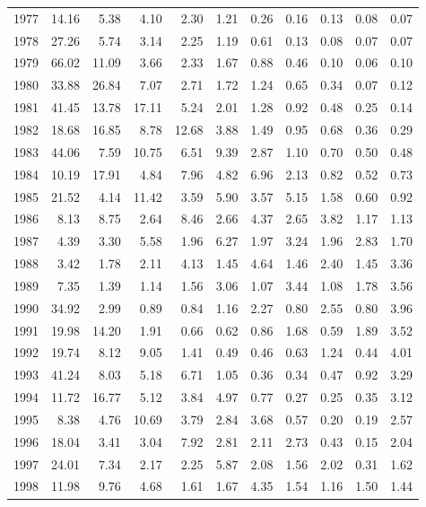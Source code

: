 \documentclass[]{article}
\begin{document}
\begin{table}[ht]
\begin{tabular}{rrrrrrrrrrr}
  1977 & 14.16 & 5.38 & 4.10 & 2.30 & 1.21 & 0.26 & 0.16 & 0.13 & 0.08 & 0.07 \\ 
  1978 & 27.26 & 5.74 & 3.14 & 2.25 & 1.19 & 0.61 & 0.13 & 0.08 & 0.07 & 0.07 \\ 
  1979 & 66.02 & 11.09 & 3.66 & 2.33 & 1.67 & 0.88 & 0.46 & 0.10 & 0.06 & 0.10 \\ 
  1980 & 33.88 & 26.84 & 7.07 & 2.71 & 1.72 & 1.24 & 0.65 & 0.34 & 0.07 & 0.12 \\ 
  1981 & 41.45 & 13.78 & 17.11 & 5.24 & 2.01 & 1.28 & 0.92 & 0.48 & 0.25 & 0.14 \\ 
  1982 & 18.68 & 16.85 & 8.78 & 12.68 & 3.88 & 1.49 & 0.95 & 0.68 & 0.36 & 0.29 \\ 
  1983 & 44.06 & 7.59 & 10.75 & 6.51 & 9.39 & 2.87 & 1.10 & 0.70 & 0.50 & 0.48 \\ 
  1984 & 10.19 & 17.91 & 4.84 & 7.96 & 4.82 & 6.96 & 2.13 & 0.82 & 0.52 & 0.73 \\ 
  1985 & 21.52 & 4.14 & 11.42 & 3.59 & 5.90 & 3.57 & 5.15 & 1.58 & 0.60 & 0.92 \\ 
  1986 & 8.13 & 8.75 & 2.64 & 8.46 & 2.66 & 4.37 & 2.65 & 3.82 & 1.17 & 1.13 \\ 
  1987 & 4.39 & 3.30 & 5.58 & 1.96 & 6.27 & 1.97 & 3.24 & 1.96 & 2.83 & 1.70 \\ 
  1988 & 3.42 & 1.78 & 2.11 & 4.13 & 1.45 & 4.64 & 1.46 & 2.40 & 1.45 & 3.36 \\ 
  1989 & 7.35 & 1.39 & 1.14 & 1.56 & 3.06 & 1.07 & 3.44 & 1.08 & 1.78 & 3.56 \\ 
  1990 & 34.92 & 2.99 & 0.89 & 0.84 & 1.16 & 2.27 & 0.80 & 2.55 & 0.80 & 3.96 \\ 
  1991 & 19.98 & 14.20 & 1.91 & 0.66 & 0.62 & 0.86 & 1.68 & 0.59 & 1.89 & 3.52 \\ 
  1992 & 19.74 & 8.12 & 9.05 & 1.41 & 0.49 & 0.46 & 0.63 & 1.24 & 0.44 & 4.01 \\ 
  1993 & 41.24 & 8.03 & 5.18 & 6.71 & 1.05 & 0.36 & 0.34 & 0.47 & 0.92 & 3.29 \\ 
  1994 & 11.72 & 16.77 & 5.12 & 3.84 & 4.97 & 0.77 & 0.27 & 0.25 & 0.35 & 3.12 \\ 
  1995 & 8.38 & 4.76 & 10.69 & 3.79 & 2.84 & 3.68 & 0.57 & 0.20 & 0.19 & 2.57 \\ 
  1996 & 18.04 & 3.41 & 3.04 & 7.92 & 2.81 & 2.11 & 2.73 & 0.43 & 0.15 & 2.04 \\ 
  1997 & 24.01 & 7.34 & 2.17 & 2.25 & 5.87 & 2.08 & 1.56 & 2.02 & 0.31 & 1.62 \\ 
  1998 & 11.98 & 9.76 & 4.68 & 1.61 & 1.67 & 4.35 & 1.54 & 1.16 & 1.50 & 1.44 \\ 

\end{tabular}
\end{table}
\end{document}
